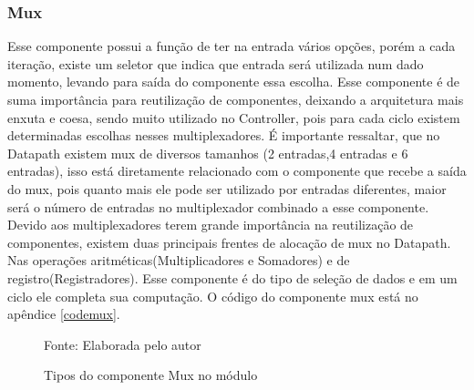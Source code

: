\subsubsection{Mux}
Esse componente possui a função de ter na entrada vários opções, porém a cada iteração, existe um seletor que indica que entrada será utilizada num dado momento, levando para saída do componente essa escolha. Esse componente é de suma importância para reutilização de componentes, deixando a arquitetura mais enxuta e coesa, sendo muito utilizado no Controller, pois para cada ciclo existem determinadas escolhas nesses multiplexadores. É importante ressaltar, que no Datapath existem mux de diversos tamanhos (2 entradas,4 entradas e 6 entradas), isso está diretamente relacionado com o componente que recebe a saída do mux, pois quanto mais ele pode ser utilizado por entradas diferentes, maior será o número de entradas no multiplexador combinado a esse componente. Devido aos multiplexadores terem grande importância na reutilização de componentes, existem duas principais frentes de alocação de mux no Datapath. Nas operações aritméticas(Multiplicadores e Somadores) e de registro(Registradores). Esse componente é do tipo de seleção de dados e em um ciclo ele completa sua computação. O código do componente mux está no apêndice \ref{codemux}.	

\begin{figure}[H]
		\caption{Tipos do componente Mux no módulo 	}
	\centering
	\quad %
	\quad %

		{Fonte: Elaborada pelo autor}
	\label{fig01}
\end{figure}

